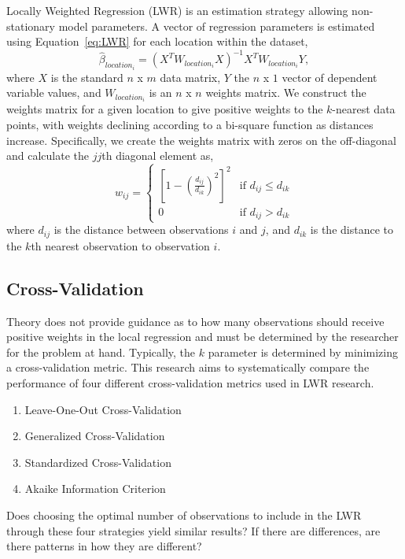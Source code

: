 \documentclass{article}
\begin{document}
Locally Weighted Regression (LWR) is an estimation strategy allowing non-stationary model parameters. A vector of regression parameters is estimated using Equation~\eqref{eq:LWR} for each location within the dataset, 
\begin{equation}\label{eq:LWR}
\hat{\beta}_{location_i} =(X^TW_{location_i}X)^{-1}X^TW_{location_i}Y,
\end{equation}
where $X$ is the standard $n$ x $m$ data matrix, $Y$ the $n$ x $1$ vector of dependent variable values, and $W_{location_i}$ is an $n$ x $n$ weights matrix. We construct the weights matrix for a given location to give positive weights to the $k$-nearest data points, with weights declining according to a bi-square function as distances increase.  Specifically, we create the weights matrix with zeros on the off-diagonal and calculate the $jj$th diagonal element as,
\begin{equation}\label{eq:bisquare}
w_{ij}= 
\begin{cases} \left[1-\left(\frac{d_{ij}}{d_{ik}}\right)^2\right]^2 & \text{if $d_{ij}\leq d_{ik}$} \\
0 &\text{if $d_{ij} > d_{ik}$}
\end{cases}
\end{equation}
where $d_{ij}$ is the distance between observations $i$ and $j$, and $d_{ik}$ is the distance to the $k$th nearest observation to observation $i$.

\subsection{Cross-Validation}
Theory does not provide guidance as to how many observations should receive positive weights in the local regression and must be determined by the researcher for the problem at hand. Typically, the $k$ parameter is determined by minimizing a cross-validation metric. This research aims to systematically compare the performance of four different cross-validation metrics used in LWR research.
\begin{enumerate}
\item Leave-One-Out Cross-Validation
\item Generalized Cross-Validation 
\item Standardized Cross-Validation
\item Akaike Information Criterion
\end{enumerate}

Does choosing the optimal number of observations to include in the LWR through these four strategies yield similar results? If there are differences, are there patterns in how they are different?
\end{document}
